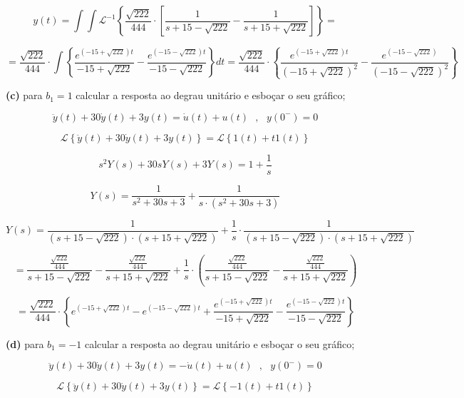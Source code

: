 \documentclass{article}
\begin{document}
\[ y(t) = \int \int \mathcal{L}^{-1} \left\{\frac{\sqrt{222}}{444} \cdot \left[ \frac{1}{s + 15 - \sqrt{222}} - \frac{1}{s + 15 + \sqrt{222}} \right] \right\} = \]

\[ = \frac{\sqrt{222}}{444} \cdot \int \left\{ \frac{e^{(-15+\sqrt{222})t}}{-15+\sqrt{222}} - \frac{e^{(-15-\sqrt{222})t}}{-15-\sqrt{222}} \right\} dt = \frac{\sqrt{222}}{444} \cdot \left\{ \frac{e^{(-15+\sqrt{222})t}}{(-15+\sqrt{222})^{2}} - \frac{e^{(-15-\sqrt{222})}}{(-15-\sqrt{222})^{2}} \right\} \]

\vspace{\baselineskip}

\textbf{(c)} para $b_1 = 1$ calcular a resposta ao degrau unitário e esboçar o seu gráfico;

\[\ddot{y}(t) + 30\dot{y}(t) + 3y(t) = \dot{u}(t) + u(t)\,\,\,\,,\,\,\,\,y(0^{-}) = 0\]

\[\mathcal{L} \left\{\ddot{y}(t) + 30\dot{y}(t) + 3y(t)\right\} = \mathcal{L} \left\{1(t) + t1(t)\right\}\]

\[ s^{2}Y(s) + 30sY(s) + 3Y(s) = 1 + \frac{1}{s} \]

\[Y(s) = \frac{1}{s^{2} + 30s + 3} + \frac{1}{s \cdot (s^{2} + 30s + 3)}\]

\[ Y(s) = \frac{1}{(s + 15 - \sqrt{222}) \cdot (s + 15 + \sqrt{222})} + \frac{1}{s} \cdot \frac{1}{(s + 15 - \sqrt{222}) \cdot (s + 15 + \sqrt{222})}\]

\[ = \frac{ \frac{\sqrt{222}}{444}}{s + 15 - \sqrt{222}} - \frac{\frac{\sqrt{222}}{444}}{s + 15 + \sqrt{222}} + \frac{1}{s} \cdot \left(\frac{ \frac{\sqrt{222}}{444}}{s + 15 - \sqrt{222}} - \frac{\frac{\sqrt{222}}{444}}{s + 15 + \sqrt{222}}\right) \]

\[ = \frac{\sqrt{222}}{444} \cdot \left\{ e^{(-15+\sqrt{222})t} - e^{(-15-\sqrt{222})t} + \frac{e^{(-15+\sqrt{222})t}}{-15+\sqrt{222}} - \frac{e^{(-15-\sqrt{222})t}}{-15-\sqrt{222}} \right\} \]

\vspace{\baselineskip}

\textbf{(d)} para $b_1 = -1$ calcular a resposta ao degrau unitário e esboçar o seu gráfico;

\vspace{\baselineskip}

\[\ddot{y}(t) + 30\dot{y}(t) + 3y(t) = - \dot{u}(t) + u(t)\,\,\,\,,\,\,\,\,y(0^{-}) = 0\]

\[\mathcal{L} \left\{\ddot{y}(t) + 30\dot{y}(t) + 3y(t)\right\} = \mathcal{L} \left\{- 1(t) + t1(t)\right\}\]
\end{document}
